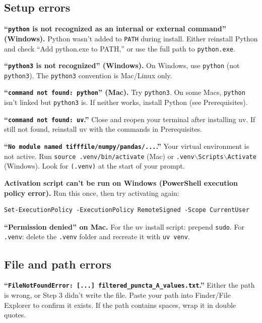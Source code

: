 \documentclass[11pt]{article}
\newcommand{\code}[1]{\texttt{#1}}
\begin{document}
\subsection{Setup errors}

\textbf{``\code{python} is not recognized as an internal or external
command'' (Windows).} Python wasn't added to \code{PATH} during
install. Either reinstall Python and check ``Add python.exe to
PATH,'' or use the full path to \code{python.exe}.

\textbf{``\code{python3} is not recognized'' (Windows).} On Windows,
use \code{python} (not \code{python3}). The \code{python3} convention
is Mac/Linux only.

\textbf{``\code{command not found: python}'' (Mac).} Try
\code{python3}. On some Macs, \code{python} isn't linked but
\code{python3} is. If neither works, install Python (see
Prerequisites).

\textbf{``\code{command not found: uv}.''} Close and reopen your
terminal after installing uv. If still not found, reinstall uv with
the commands in Prerequisites.

\textbf{``\code{No module named tifffile/numpy/pandas/...}.''} Your
virtual environment is not active. Run
\code{source .venv/bin/activate} (Mac) or
\code{.venv$\backslash$Scripts$\backslash$Activate} (Windows). Look
for \code{(.venv)} at the start of your prompt.

\textbf{Activation script can't be run on Windows (PowerShell
execution policy error).} Run this once, then try activating again:

\begin{lstlisting}
Set-ExecutionPolicy -ExecutionPolicy RemoteSigned -Scope CurrentUser
\end{lstlisting}

\textbf{``Permission denied'' on Mac.} For the uv install script:
prepend \code{sudo}. For \code{.venv}: delete the \code{.venv}
folder and recreate it with \code{uv venv}.

\subsection{File and path errors}

\textbf{``\code{FileNotFoundError: [...] filtered\_puncta\_A\_values.txt}.''}
Either the path is wrong, or Step 3 didn't write the file. Paste
your path into Finder/File Explorer to confirm it exists. If the
path contains spaces, wrap it in double quotes.
\end{document}
